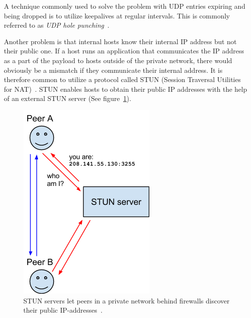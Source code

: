 A technique commonly used to solve the problem with UDP entries expiring and being dropped is to utilize keepalives at regular intervals. This is commonly referred to as \emph{UDP hole punching}~\cite{UDPHolePunching:Online}.

Another problem is that internal hosts know their internal IP address but not their public one. If a host runs an application that communicates the IP address as a part of the payload to hosts outside of the private network, there would obviously be a mismatch if they communicate their internal address. It is therefore common to utilize a protocol called STUN (Session Traversal Utilities for NAT)~\cite{RFC5389:Online}. STUN enables hosts to obtain their public IP addresses with the help of an external STUN server (See figure~\ref{fig:WebRTC - STUN}).

\begin{figure}[htp]
\centering
\includegraphics[width=\textwidth,height=0.2\paperheight,keepaspectratio
]{figures/webrtc-stun}
\caption{STUN servers let peers in a private network behind firewalls discover their public IP-addresses~\cite{WebRTCArchitecture:2014:Online}.}
\label{fig:WebRTC - STUN}
\end{figure}

